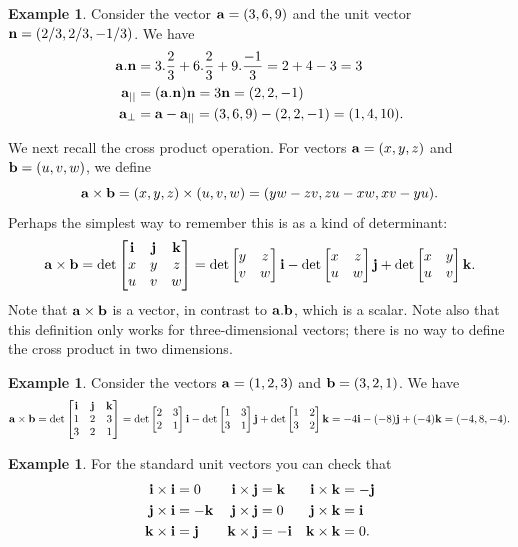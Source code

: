 \documentclass[reqno]{amsart}
\theoremstyle{definition}
\newtheorem{example}[theorem]{Example}
\begin{document}
\begin{example}
 Consider the vector $\mathbf{a}=(3,6,9)$ and the unit vector
 $\mathbf{n}=(2/3,2/3,-1/3)$.  We have 
 \begin{align*}
  \mathbf{a}.\mathbf{n} &= 3.\frac{2}{3} + 6.\frac{2}{3} + 9.\frac{-1}{3} 
           = 2+4-3 = 3 \\
  \mathbf{a}_{||} &= (\mathbf{a}.\mathbf{n})\mathbf{n} = 3\mathbf{n} = (2,2,-1) \\
  \mathbf{a}_\perp &= \mathbf{a}-\mathbf{a}_{||} = (3,6,9)-(2,2,-1) = (1,4,10).
 \end{align*}
\end{example}

We next recall the cross product operation.  For vectors $\mathbf{a}=(x,y,z)$
and $\mathbf{b}=(u,v,w)$, we define
\[ \mathbf{a}\times\mathbf{b} = (x,y,z)\times(u,v,w) = 
    (yw-zv,zu-xw,xv-yu).
\]
Perhaps the simplest way to remember this is as a kind of determinant:
\[ \mathbf{a}\times\mathbf{b} =
    \det\left[\begin{matrix} \mathbf{i} & \mathbf{j} & \mathbf{k} \\
             x   & y   & z   \\
             u   & v   & w   \end{matrix}\right] =
     \det\left[\begin{matrix} y&z\\ v&w\end{matrix}\right]\mathbf{i} - 
     \det\left[\begin{matrix} x&z\\ u&w\end{matrix}\right]\mathbf{j} +
     \det\left[\begin{matrix} x&y\\ u&v\end{matrix}\right]\mathbf{k}.
\]
Note that $\mathbf{a}\times\mathbf{b}$ is a vector, in contrast to $\mathbf{a}.\mathbf{b}$, which is
a scalar.  Note also that this definition only works for
three-dimensional vectors; there is no way to define the cross product
in two dimensions.

\begin{example}
 Consider the vectors $\mathbf{a}=(1,2,3)$ and $\mathbf{b}=(3,2,1)$.  We have
 \[ \mathbf{a}\times\mathbf{b} = 
    \det\left[\begin{matrix} \mathbf{i} & \mathbf{j} & \mathbf{k} \\
             1   & 2   & 3   \\
             3   & 2   & 1   \end{matrix}\right] =
     \det\left[\begin{matrix} 2&3\\ 2&1\end{matrix}\right]\mathbf{i} - 
     \det\left[\begin{matrix} 1&3\\ 3&1\end{matrix}\right]\mathbf{j} +
     \det\left[\begin{matrix} 1&2\\ 3&2\end{matrix}\right]\mathbf{k} = 
      -4\mathbf{i} - (-8)\mathbf{j} + (-4)\mathbf{k} = (-4,8,-4).
 \]
\end{example}
\begin{example}
 For the standard unit vectors you can check that
 \begin{align*}
  \mathbf{i}\times\mathbf{i} &= 0    & \mathbf{i}\times\mathbf{j} &=  \mathbf{k} & \mathbf{i}\times\mathbf{k} &= -\mathbf{j} \\
  \mathbf{j}\times\mathbf{i} &= -\mathbf{k} & \mathbf{j}\times\mathbf{j} &= 0    & \mathbf{j}\times\mathbf{k} &=  \mathbf{i} \\
  \mathbf{k}\times\mathbf{i} &=  \mathbf{j} & \mathbf{k}\times\mathbf{j} &= -\mathbf{i} & \mathbf{k}\times\mathbf{k} &= 0.
 \end{align*}
\end{example}
\end{document}
